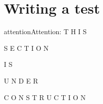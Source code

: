 \documentclass[letterpaper,10pt,english]{jupyterBook}
\begin{document}
\chapter{Writing a test}
\label{\detokenize{11_Writing_a_test:writing-a-test}}\label{\detokenize{11_Writing_a_test::doc}}
\begin{sphinxadmonition}{attention}{Attention:}
\sphinxAtStartPar
T H I S

\sphinxAtStartPar
S E C T I O N

\sphinxAtStartPar
I S

\sphinxAtStartPar
U N D E R

\sphinxAtStartPar
C O N S T R U C T I O N
\end{sphinxadmonition}







\renewcommand{\indexname}{Index}
\printindex
\end{document}
